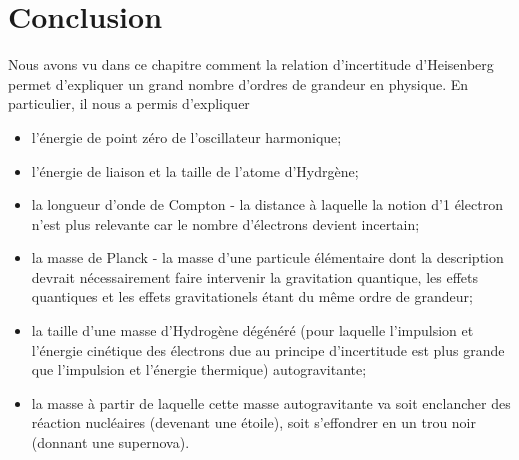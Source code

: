\documentclass{book}
\begin{document}
\section{Conclusion}

Nous avons vu dans ce chapitre comment la relation d'incertitude d'Heisenberg permet d'expliquer un grand nombre d'ordres de grandeur en physique. En particulier, il nous a permis d'expliquer 
\begin{itemize}
\item l'énergie de point zéro de l'oscillateur harmonique; \\
\item l'énergie de liaison et la taille de l'atome d'Hydrgène;\\
\item la longueur d'onde de Compton - la distance à laquelle la notion d'1 électron n'est plus relevante car le nombre d'électrons devient incertain; \\
\item la masse de Planck - la masse d'une particule élémentaire dont la description devrait nécessairement faire intervenir la gravitation quantique, les effets quantiques et les effets gravitationels étant du même ordre de grandeur; \\
\item la taille d'une masse d'Hydrogène dégénéré (pour laquelle l'impulsion et l'énergie cinétique des électrons due au principe d'incertitude est plus grande que l'impulsion et l'énergie thermique) autogravitante;\\
\item la masse à partir de laquelle cette masse autogravitante va soit enclancher des réaction nucléaires (devenant une étoile), soit s'effondrer en un trou noir (donnant une supernova).
\end{itemize}
\end{document}
